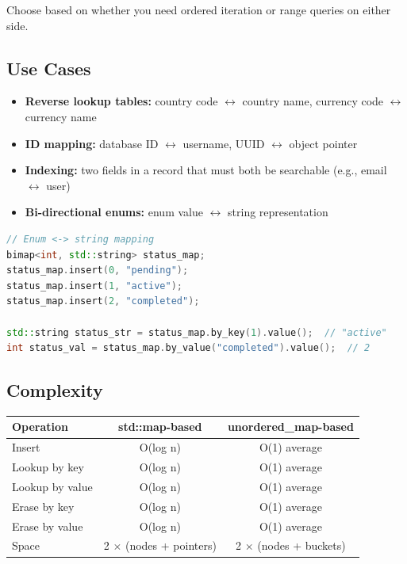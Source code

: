 Choose based on whether you need ordered iteration or range queries on either side.

\subsection{Use Cases}

\begin{itemize}
\item \textbf{Reverse lookup tables:} country code $\leftrightarrow$ country name, currency code $\leftrightarrow$ currency name
\item \textbf{ID mapping:} database ID $\leftrightarrow$ username, UUID $\leftrightarrow$ object pointer
\item \textbf{Indexing:} two fields in a record that must both be searchable (e.g., email $\leftrightarrow$ user)
\item \textbf{Bi-directional enums:} enum value $\leftrightarrow$ string representation
\end{itemize}

\begin{lstlisting}[language=C++]
// Enum <-> string mapping
bimap<int, std::string> status_map;
status_map.insert(0, "pending");
status_map.insert(1, "active");
status_map.insert(2, "completed");

std::string status_str = status_map.by_key(1).value();  // "active"
int status_val = status_map.by_value("completed").value();  // 2
\end{lstlisting}

\subsection{Complexity}

\begin{center}
\begin{tabular}{lcc}
\toprule
Operation & std::map-based & unordered\_map-based \\
\midrule
Insert & O(log n) & O(1) average \\
Lookup by key & O(log n) & O(1) average \\
Lookup by value & O(log n) & O(1) average \\
Erase by key & O(log n) & O(1) average \\
Erase by value & O(log n) & O(1) average \\
Space & 2 $\times$ (nodes + pointers) & 2 $\times$ (nodes + buckets) \\
\bottomrule
\end{tabular}
\end{center}

